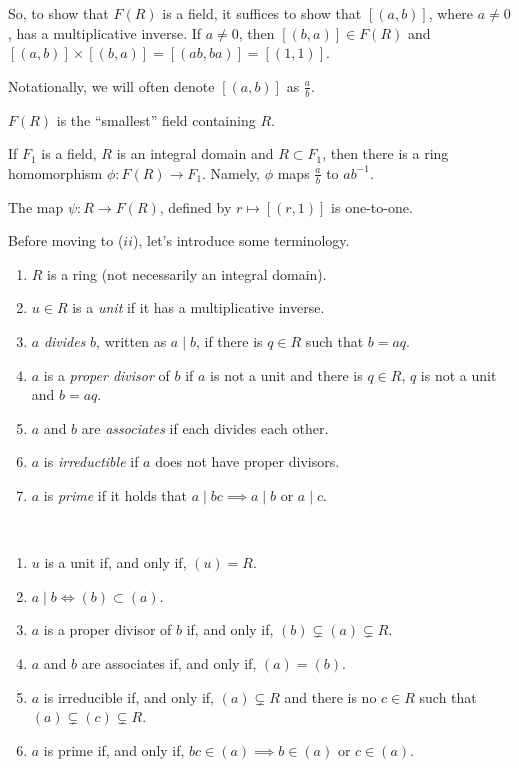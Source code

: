 So, to show that  $F(R)$ is a field, it suffices to show that  $[(a, b)]$, where $a \neq 0$, has a multiplicative inverse. If $a \neq 0$, then $[(b, a)] \in F(R)$ and $[(a, b)] \times [(b, a)] = [(ab, ba)] = [(1, 1)]$.

Notationally, we will often denote $[(a, b)]$ as $\frac{a}{b}$.

 \begin{prop}
	 $F(R)$ is the ``smallest'' field containing $R$.
\end{prop}

\begin{thm}
	If $F_1$ is a field, $R$ is an integral domain and $R \subset F_1$, then there is a ring homomorphism $\phi: F(R) \to F_1$. Namely, $\phi$ maps $\frac{a}{b}$ to $ab^{-1}$.
\end{thm}

\begin{prop}
	The map $\psi: R \to F(R)$, defined by $r \mapsto [(r, 1)]$ is one-to-one.
\end{prop}

Before moving to ($ii$), let's introduce some terminology.
\begin{enumerate}[label = \textbullet]
	\item $R$ is a ring (not necessarily an integral domain).
	\item $u \in R$ is a \emph{unit} if it has a multiplicative inverse.
	\item $a$ \emph{divides} $b$, written as $a \mid b$, if there is $q \in R$ such that $b = aq$. 
	\item $a$ is a \emph{proper divisor} of  $b$ if $a$ is not a unit and there is $q \in R$, $q$ is not a unit and $b = aq$.
	\item  $a$ and $b$ are \emph{associates} if each divides each other.
	\item $a$ is \emph{irreductible} if $a$ does not have proper divisors.
	\item $a$ is \emph{prime} if it holds that $a \mid bc \implies a \mid b$ or  $a \mid c$.
\end{enumerate}

\begin{lem}~
	\begin{enumerate}[label = \textbullet]
		\item $u$ is a unit if, and only if, $(u) = R$.
		\item $a \mid b \iff (b) \subset (a)$.
		\item $a$ is a proper divisor of $b$ if, and only if, $(b) \subsetneq (a) \subsetneq R$.
		\item $a$ and $b$ are associates if, and only if, $(a) = (b)$.
		\item $a$ is irreducible if, and only if, $(a) \subsetneq R$ and there is no $c \in R$ such that $(a) \subsetneq (c) \subsetneq R$.
		\item $a$ is prime if, and only if, $bc \in (a) \implies b \in (a)$ or $c \in (a)$.
	\end{enumerate}
\end
{lem}

